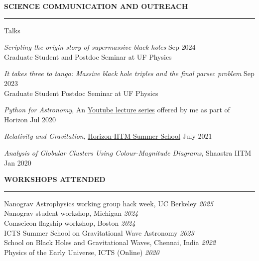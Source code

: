 \documentclass{resume} %
\renewenvironment{rSection}[1]{
\sectionskip
\textbf{\textcolor{C2}{\MakeUppercase{#1}}}
\sectionlineskip
\hrule
\begin{list}{}{
\setlength{\leftmargin}{1.5em}
}
\item[]
}{
\end{list}
}
\begin{document}
\begin{rSection}{Science communication and outreach}
    \begin{rSubsection}{Talks}{}{}{}
    \item \emph{Scripting the origin story of supermassive black holes} \hfill Sep 2024 \\ Graduate Student and Postdoc Seminar at UF Physics 
    \item \emph{It takes three to tango: Massive black hole triples and the final parsec problem}  \hfill Sep 2023 \\ Graduate Student Postdoc Seminar at UF Physics
     \item \textit{\color{C2} Python for Astronomy}, An \href{https://youtu.be/HfYR0uwYAyM}{Youtube lecture series} offered by me as part of Horizon \hfill Jul 2020
    \item \textit{\color{C2} Relativity and Gravitation}, \href{https://github.com/HorizonIITM/summer-school-2021}{Horizon-IITM Summer School} \hfill July 2021
    \item \textit{\color{C2} Analysis of Globular Clusters Using
    Colour-Magnitude Diagrams}, Shaastra IITM \hfill Jan 2020
    \end{rSubsection}
\end{rSection}


\begin{rSection}{Workshops Attended }
    {Nanograv Astrophysics working group hack week, UC Berkeley} \hfill {\em 2025}\\
    {Nanograv student workshop, Michigan} \hfill {\em 2024}\\
    {Comscicon flagship workshop, Boston} \hfill {\em 2024}\\
    {ICTS Summer School on Gravitational Wave Astronomy} \hfill {\em2023}\\
    {School on Black Holes and Gravitational Waves, Chennai, India} \hfill {\em 2022}\\
    {Physics of the Early Universe, ICTS (Online)} \hfill {\em 2020}
    
\end{rSection}
\end{document}
